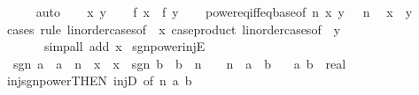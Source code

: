 \begin{isabellebody}
\ \ \ \ \isamarkupfalse%
\ auto\isanewline
\ \ \isamarkupfalse%
\ x\ y\isanewline
\ \ \isamarkupfalse%
\ {\isachardoublequoteopen}{\isacharquery}{\kern0pt}f\ x\ {\isacharequal}{\kern0pt}\ {\isacharquery}{\kern0pt}f\ y{\isachardoublequoteclose}\isanewline
\ \ \isamarkupfalse%
\ power{\isacharunderscore}{\kern0pt}eq{\isacharunderscore}{\kern0pt}iff{\isacharunderscore}{\kern0pt}eq{\isacharunderscore}{\kern0pt}base{\isacharbrackleft}{\kern0pt}of\ n\ {\isachardoublequoteopen}{\isasymbar}x{\isasymbar}{\isachardoublequoteclose}\ {\isachardoublequoteopen}{\isasymbar}y{\isasymbar}{\isachardoublequoteclose}{\isacharbrackright}{\kern0pt}\ {\isacartoucheopen}{}\ {\isacharless}{\kern0pt}\ n{\isacartoucheclose}\ \isamarkupfalse%
\ {\isachardoublequoteopen}x\ {\isacharequal}{\kern0pt}\ y{\isachardoublequoteclose}\isanewline
\ \ \ \ \isamarkupfalse%
\ {\isacharparenleft}{\kern0pt}cases\ rule{\isacharcolon}{\kern0pt}\ linorder{\isacharunderscore}{\kern0pt}cases{\isacharbrackleft}{\kern0pt}of\ {}\ x{\isacharcomma}{\kern0pt}\ case{\isacharunderscore}{\kern0pt}product\ linorder{\isacharunderscore}{\kern0pt}cases{\isacharbrackleft}{\kern0pt}of\ {}\ y{\isacharbrackright}{\kern0pt}{\isacharbrackright}{\kern0pt}{\isacharparenright}{\kern0pt}\isanewline
\ \ \ \ \ \ \ {\isacharparenleft}{\kern0pt}simp{\isacharunderscore}{\kern0pt}all\ add{\isacharcolon}{\kern0pt}\ x{\isacharparenright}{\kern0pt}\isanewline
{}\isamarkupfalse%
%
\endisatagproof
{\isafoldproof}%
%
\isadelimproof
\isanewline
%
\endisadelimproof
\isanewline
{}\isamarkupfalse%
\ sgn{\isacharunderscore}{\kern0pt}power{\isacharunderscore}{\kern0pt}injE{\isacharcolon}{\kern0pt}\isanewline
\ \ {\isachardoublequoteopen}sgn\ a\ {\isacharasterisk}{\kern0pt}\ {\isasymbar}a{\isasymbar}\ {\isacharcircum}{\kern0pt}\ n\ {\isacharequal}{\kern0pt}\ x\ {\isasymLongrightarrow}\ x\ {\isacharequal}{\kern0pt}\ sgn\ b\ {\isacharasterisk}{\kern0pt}\ {\isasymbar}b{\isasymbar}\ {\isacharcircum}{\kern0pt}\ n\ {\isasymLongrightarrow}\ {}\ {\isacharless}{\kern0pt}\ n\ {\isasymLongrightarrow}\ a\ {\isacharequal}{\kern0pt}\ b{\isachardoublequoteclose}\isanewline
\ \ \ a\ b\ {\isacharcolon}{\kern0pt}{\isacharcolon}{\kern0pt}\ real\isanewline
%
\isadelimproof
\ \ %
\endisadelimproof
%
\isatagproof
{}\isamarkupfalse%
\ inj{\isacharunderscore}{\kern0pt}sgn{\isacharunderscore}{\kern0pt}power{\isacharbrackleft}{\kern0pt}THEN\ injD{\isacharcomma}{\kern0pt}\ of\ n\ a\ b{\isacharbrackright}{\kern0pt}\ \isamarkupfalse%

\end{isabellebody}
